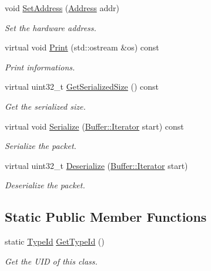 \begin{DoxyCompactItemize}
void \hyperlink{classns3_1_1Icmpv6OptionLinkLayerAddress_af176c512ee8881832c5cf50105331f21}{Set\+Address} (\hyperlink{classns3_1_1Address}{Address} addr)
\begin{DoxyCompactList}\small\item\em Set the hardware address. \end{DoxyCompactList}\item 
virtual void \hyperlink{classns3_1_1Icmpv6OptionLinkLayerAddress_ad07cc16876aebf4c05d5585da21cecb3}{Print} (std\+::ostream \&os) const 
\begin{DoxyCompactList}\small\item\em Print informations. \end{DoxyCompactList}\item 
virtual uint32\+\_\+t \hyperlink{classns3_1_1Icmpv6OptionLinkLayerAddress_a8bdbb6fbbbfd2cf22e31181fcd3a1106}{Get\+Serialized\+Size} () const 
\begin{DoxyCompactList}\small\item\em Get the serialized size. \end{DoxyCompactList}\item 
virtual void \hyperlink{classns3_1_1Icmpv6OptionLinkLayerAddress_a472a16e3a3105e71bfb4d768d29fc0d8}{Serialize} (\hyperlink{classns3_1_1Buffer_1_1Iterator}{Buffer\+::\+Iterator} start) const 
\begin{DoxyCompactList}\small\item\em Serialize the packet. \end{DoxyCompactList}\item 
virtual uint32\+\_\+t \hyperlink{classns3_1_1Icmpv6OptionLinkLayerAddress_a84c1d39a00747d25defb642b7fbdb411}{Deserialize} (\hyperlink{classns3_1_1Buffer_1_1Iterator}{Buffer\+::\+Iterator} start)
\begin{DoxyCompactList}\small\item\em Deserialize the packet. \end{DoxyCompactList}\end{DoxyCompactItemize}
\subsection*{Static Public Member Functions}
\begin{DoxyCompactItemize}
\item 
static \hyperlink{classns3_1_1TypeId}{Type\+Id} \hyperlink{classns3_1_1Icmpv6OptionLinkLayerAddress_a9eeacf9f8fa441a26fe807dd0c06e47d}{Get\+Type\+Id} ()
\begin{DoxyCompactList}\small\item\em Get the U\+ID of this class. \end{DoxyCompactList}\end{DoxyCompactItemize}
